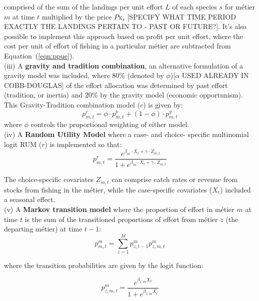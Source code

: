 \documentclass[12pt, halfline, a4paper]{ouparticle}
\begin{document}
comprised of the sum of the landings per unit effort $L$ of each species $s$ for métier $m$ at
time $t$ multiplied by the price $P\text{x}_{s}$ [SPECIFY WHAT TIME PERIOD EXACTLY THE LANDINGS PERTAIN TO - PAST OR FUTURE?]. It's also possible to
implement this approach based on profit per unit effort, where the cost per
unit of effort of fishing in a particular métier are subtracted from Equation~(\ref{eqn:ppue}). \\

(iii) A \textbf{gravity and tradition combination}, an alternative formulation
of a gravity model was included, where 80\% (denoted by $\phi$)[$\alpha$ USED ALREADY IN COBB-DOUGLAS] of the effort
allocation was determined by past effort (tradition, or inertia) and 20\% by
the gravity model (economic opportunism). This Gravity-Tradition combination
model ($c$) is given by:
\begin{equation}
	p^{c}_{m,t} = \phi \cdot p^{b}_{m,t} + (1 - \phi) \cdot p^{g}_{m,t}
\end{equation}
where $\phi$ controls the proportional weighting of either model. \\ 

(iv) A \textbf{Random Utility Model} where a case- and choice- specific
multinomial logit RUM ($r$) is implemented so that:  
\begin{equation}
p^{r}_{m,t} = \frac{e^{\beta_{m} \cdot X_{t} + \gamma \cdot Z_{m,t}}}{1 + 
	e^{\beta_{m} \cdot X_{t} + \gamma \cdot Z_{m,t}}}
\label{eqn:rum}
\end{equation} 

The choice-specific covariates $Z_{m,t}$ can comprise catch rates or revenue
from stocks from fishing in the métier, while the case-specific covariates
($X_{t}$) included a seasonal effect. \\

(v) A \textbf{Markov transition model} where the proportion of effort in métier
$m$ at time $t$ is the sum of the transitioned proportions of effort from
métier $z$ (the departing métier) at time $t-1$:
\begin{equation}
p^m_{m,t} = \sum_{z = 1}^{M} p^m_{z, t-1} p^m_{z,m,t}
\end{equation}

where the transition probabilities are given by the logit function:

\begin{equation}
p^m_{z,m,t} = \frac{e^{\beta_{z,m} X_{t}}}{1+e^{\beta_{z,m} X_{t}}}
\end{equation}
\end{document}

